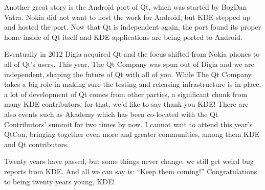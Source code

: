 Another great story is the Android port of Qt, which was started by BogDan Vatra. Nokia did not want to host the work for Android, but KDE stepped up and hosted the port. Now that Qt is independent again, the port found its proper home inside of Qt itself and KDE applications are being ported to Android.

Eventually in 2012 Digia acquired Qt and the focus shifted from Nokia phones to all of Qt's users. This year, The Qt Company was spun out of Digia and we are independent, shaping the future of Qt with all of you. While The Qt Company takes a big role in making sure the testing and releasing infrastructure is in place, a lot of development of Qt comes from other parties, a significant chunk from many KDE contributors, for that, we'd like to say thank you KDE! There are also events such as Akademy which has been co-located with the Qt Contributors' summit for two times by now. I cannot wait to attend this year's QtCon, bringing together even more and greater communities, among them KDE and Qt contributors.

Twenty years have passed, but some things never change: we still get weird bug reports from KDE. And all we can say is: “Keep them coming!” Congratulations to being twenty years young, KDE!
